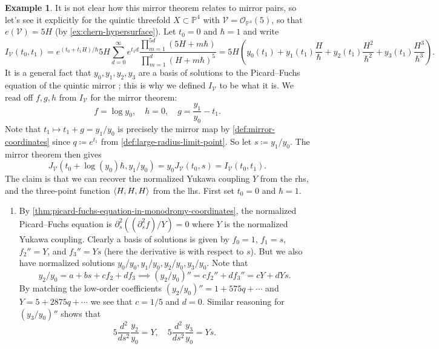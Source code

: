 \documentclass{report}
\theoremstyle{plain}
\theoremstyle{definition}
\newtheorem{example}[theorem]{Example}
\theoremstyle{remark}
\newcommand{\di}{\partial}
\newcommand{\bP}{\mathbb{P}}
\newcommand{\cO}{\mathcal{O}}
\newcommand{\cV}{\mathcal{V}}
\DeclarePairedDelimiter{\inner}{\langle}{\rangle}
\begin{document}
\begin{example} \label{ex:mirror-theorem-quintic-threefold}
  It is not clear how this mirror theorem relates to mirror pairs, so
  let's see it explicitly for the quintic threefold $X \subset \bP^4$
  with $\cV = \cO_{\bP^4}(5)$, so that $e(\cV) = 5H$ (by
  \ref{ex:chern-hypersurface}). Let $t_0 = 0$ and $\hbar = 1$ and
  write
  \begin{equation} \label{eq:givental-i-function-quintic-threefold}
    I_{\cV}(t_0, t_1) = e^{(t_0 + t_1H)/\hbar} 5H \sum_{d=0}^\infty e^{t_1d} \frac{\prod_{m=1}^{5d} (5H + m\hbar)}{\prod_{m=1}^d (H + m\hbar)^5} = 5H\left(y_0(t_1) + y_1(t_1)\frac{H}{\hbar} + y_2(t_1)\frac{H^2}{\hbar^2} + y_3(t_1)\frac{H^3}{\hbar^3}\right).
  \end{equation}
  It is a general fact that $y_0, y_1, y_2, y_3$ are a basis of
  solutions to the Picard--Fuchs equation of the quintic mirror
  \cite[Page 16]{Givental1995} \cite[Example 6.3.4.1]{Cox1999}; this
  is why we defined $I_{\cV}$ to be what it is. We read off $f, g, h$
  from $I_{\cV}$ for the mirror theorem:
  \[ f = \log y_0, \quad h = 0, \quad g = \frac{y_1}{y_0} - t_1. \]
  Note that $t_1 \mapsto t_1 + g = y_1/y_0$ is precisely the mirror
  map by \ref{def:mirror-coordinates} since $q \coloneqq e^{t_1}$ from
  \ref{def:large-radius-limit-point}. So let $s \coloneqq y_1/y_0$.
  The mirror theorem then gives
  \[ J_{\cV}(t_0 + \log(y_0)\hbar, y_1/y_0) = y_0 J_{\cV}(t_0, s) = I_{\cV}(t_0, t_1). \]
  The claim is that we can recover the normalized Yukawa coupling $Y$
  from the rhs, and the three-point function $\inner{H,H,H}$ from the
  lhs. First set $t_0 = 0$ and $\hbar = 1$.
  \begin{enumerate}
  \item By \ref{thm:picard-fuchs-equation-in-monodromy-coordinates},
    the normalized Picard--Fuchs equation is $\di_s^2((\di_s^2 f)/Y) =
    0$ where $Y$ is the normalized Yukawa coupling. Clearly a basis of
    solutions is given by $f_0 = 1$, $f_1 = s$, $f_2'' = Y$, and
    $f_3'' = Ys$ (here the derivative is with respect to $s$). But we
    also have normalized solutions $y_0/y_0, y_1/y_0, y_2/y_0,
    y_3/y_0$. Note that
    \[ y_2/y_0 = a + bs + cf_2 + df_3 \implies (y_2/y_0)'' = cf_2'' + df_3'' = cY + dYs. \]
    By matching the low-order coefficients $(y_2/y_0)'' = 1 + 575q +
    \cdots$ and $Y = 5 + 2875q + \cdots$ we see that $c = 1/5$ and $d
    = 0$. Similar reasoning for $(y_3/y_0)''$ shows that
    \[ 5 \frac{d^2}{ds^2} \frac{y_2}{y_0} = Y, \quad 5 \frac{d^2}{ds^2} \frac{y_3}{y_0} = Ys. \]

\end{enumerate}
\end{example}
\end{document}
